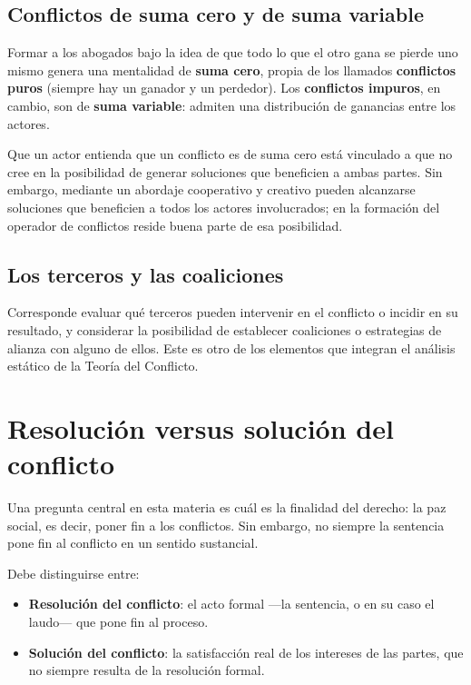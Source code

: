 \documentclass[12pt,oneside]{book}
\begin{document}
\subsection{Conflictos de suma cero y de suma variable}

\begin{important}
Formar a los abogados bajo la idea de que todo lo que el otro gana se pierde uno mismo genera una mentalidad de \textbf{suma cero}, propia de los llamados \textbf{conflictos puros} (siempre hay un ganador y un perdedor). Los \textbf{conflictos impuros}, en cambio, son de \textbf{suma variable}: admiten una distribución de ganancias entre los actores.
\end{important}

Que un actor entienda que un conflicto es de suma cero está vinculado a que no cree en la posibilidad de generar soluciones que beneficien a ambas partes. Sin embargo, mediante un abordaje cooperativo y creativo pueden alcanzarse soluciones que beneficien a todos los actores involucrados; en la formación del operador de conflictos reside buena parte de esa posibilidad.

\subsection{Los terceros y las coaliciones}

Corresponde evaluar qué terceros pueden intervenir en el conflicto o incidir en su resultado, y considerar la posibilidad de establecer coaliciones o estrategias de alianza con alguno de ellos. Este es otro de los elementos que integran el análisis estático de la Teoría del Conflicto.

\section{Resolución versus solución del conflicto}

Una pregunta central en esta materia es cuál es la finalidad del derecho: la paz social, es decir, poner fin a los conflictos. Sin embargo, no siempre la sentencia pone fin al conflicto en un sentido sustancial.

\begin{important}
Debe distinguirse entre:
\begin{itemize}
    \item \textbf{Resolución del conflicto}: el acto formal ---la sentencia, o en su caso el laudo--- que pone fin al proceso.
    \item \textbf{Solución del conflicto}: la satisfacción real de los intereses de las partes, que no siempre resulta de la resolución formal.
\end{itemize}
\end{important}
\end{document}
